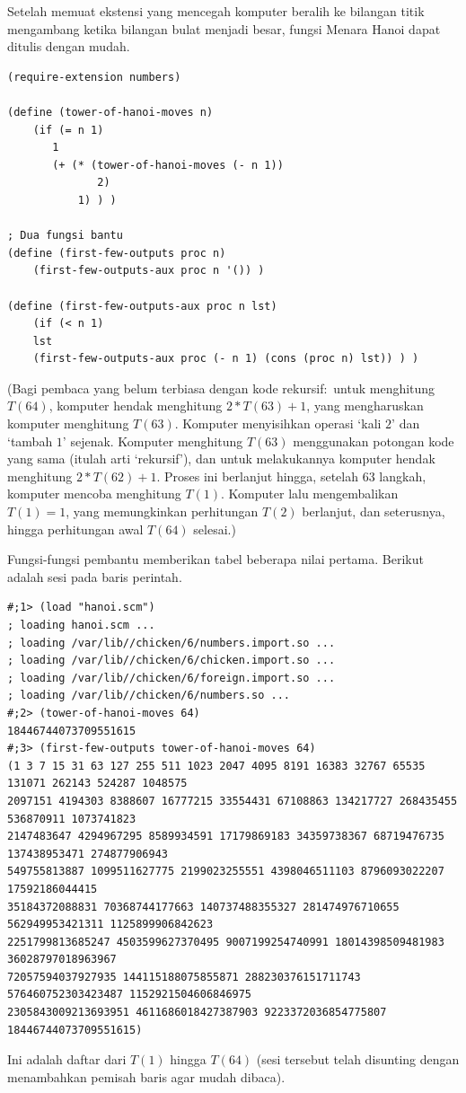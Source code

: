 Setelah memuat ekstensi yang mencegah komputer beralih ke bilangan titik
mengambang ketika bilangan bulat menjadi besar, fungsi Menara Hanoi dapat
ditulis dengan mudah.
\begin{lstlisting}
(require-extension numbers)

(define (tower-of-hanoi-moves n) 
    (if (= n 1)
       1
       (+ (* (tower-of-hanoi-moves (- n 1)) 
              2) 
           1) ) )

; Dua fungsi bantu
(define (first-few-outputs proc n)
    (first-few-outputs-aux proc n '()) )

(define (first-few-outputs-aux proc n lst)
    (if (< n 1)
    lst 
    (first-few-outputs-aux proc (- n 1) (cons (proc n) lst)) ) )
\end{lstlisting}
\noindent (Bagi pembaca yang belum terbiasa dengan kode rekursif:~untuk
menghitung $T(64)$, komputer hendak menghitung $2*T(63)+1$, yang mengharuskan
komputer menghitung $T(63)$.
Komputer menyisihkan operasi `kali $2$' dan `tambah $1$' sejenak.
Komputer menghitung $T(63)$ menggunakan potongan kode yang sama (itulah arti
`rekursif'), dan untuk melakukannya komputer hendak menghitung
$2*T(62)+1$.
Proses ini berlanjut hingga, setelah $63$ langkah, komputer mencoba menghitung
$T(1)$.
Komputer lalu mengembalikan $T(1)=1$, yang memungkinkan perhitungan $T(2)$
berlanjut, dan seterusnya, hingga perhitungan awal $T(64)$ selesai.)

Fungsi-fungsi pembantu memberikan tabel beberapa nilai pertama.
Berikut adalah sesi pada baris perintah.
\begin{lstlisting}
#;1> (load "hanoi.scm")
; loading hanoi.scm ...
; loading /var/lib//chicken/6/numbers.import.so ...
; loading /var/lib//chicken/6/chicken.import.so ...
; loading /var/lib//chicken/6/foreign.import.so ...
; loading /var/lib//chicken/6/numbers.so ...
#;2> (tower-of-hanoi-moves 64)
18446744073709551615
#;3> (first-few-outputs tower-of-hanoi-moves 64)
(1 3 7 15 31 63 127 255 511 1023 2047 4095 8191 16383 32767 65535 131071 262143 524287 1048575 
2097151 4194303 8388607 16777215 33554431 67108863 134217727 268435455 536870911 1073741823 
2147483647 4294967295 8589934591 17179869183 34359738367 68719476735 137438953471 274877906943 
549755813887 1099511627775 2199023255551 4398046511103 8796093022207 17592186044415 
35184372088831 70368744177663 140737488355327 281474976710655 562949953421311 1125899906842623 
2251799813685247 4503599627370495 9007199254740991 18014398509481983 36028797018963967 
72057594037927935 144115188075855871 288230376151711743 576460752303423487 1152921504606846975 
2305843009213693951 4611686018427387903 9223372036854775807 18446744073709551615)
\end{lstlisting}
\noindent Ini adalah daftar dari $T(1)$ hingga $T(64)$ (sesi tersebut telah
disunting dengan menambahkan pemisah baris agar mudah dibaca).
\endinput
